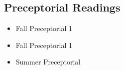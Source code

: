 \documentclass{article}
\begin{document}
\subsection{Preceptorial Readings}
\begin{itemize}
	\item Fall Preceptorial 1
	      \fallPreceptOneReadingList%
	\item Fall Preceptorial 1
	      \fallPreceptTwoReadingList%
	\item Summer Preceptorial
	      \summerPreceptReadingList%
\end{itemize}

\end{document}
